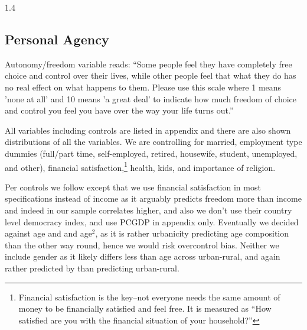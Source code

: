 \documentclass[10pt, letterpaper]{article}
\begin{document}
\begin{spacing}{1.4}
\subsection{Personal Agency}

Autonomy/freedom variable reads:
``Some people feel they have completely free
choice and control over their lives, while other people feel that what they do
has no real effect on what happens to them.  Please use this scale where 1 means
'none at all' and 10 means 'a great deal' to indicate how much freedom of choice
and control you feel you have over the way your life turns out.''


All variables including controls are listed in appendix and there are
also shown distributions of all the variables. 
We are controlling for %
married, employment type dummies (full/part time, self-employed, retired,
housewife, student, unemployed, and other),
financial satisfaction,\footnote{Financial satisfaction is the key--not everyone
  needs the same amount of money to be financially satisfied and feel free.
  It is measured as ``How satisfied are you with the financial situation of your household?''} health, kids,
and importance of religion.

Per controls we follow \citet{pitlik2016free,nikolaev2016give} except that we use financial
satisfaction in most specifications instead of income as it arguably predicts
 freedom more than income and indeed in our sample correlates higher, and also
 we don't use their country level democracy index, and use PCGDP in appendix
 only. Eventually we decided against age and and age$^2$, as it is
 rather urbanicity predicting age composition than the other way round, hence we
 would risk overcontrol bias. Neither we include gender as it likely differs
 less than age across urban-rural, and again rather predicted by than predicting
 urban-rural.  


\end{spacing}
\end{document}

